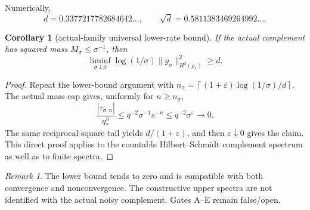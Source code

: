 \documentclass[11pt]{article}
\newtheorem{corollary}[theorem]{Corollary}
\theoremstyle{remark}\newtheorem{remark}[theorem]{Remark}
\begin{document}
Numerically,
\[
 d=0.3377217782684642\ldots,
 \qquad \sqrt d=0.5811383469264992\ldots.
\]

\begin{corollary}[actual-family universal lower-rate bound]
If the actual complement has squared mass $M_\sigma\le\sigma^{-1}$, then
\[
 \liminf_{\sigma\downarrow0}
 \log(1/\sigma)\|g_\sigma\|_{H^2(\rho_*)}^2\ge d.
\]
\end{corollary}
\begin{proof}
Repeat the lower-bound argument with
$n_\sigma=\left\lceil
 (1+\varepsilon)\log(1/\sigma)/d\right\rceil$.  The actual mass
cap gives, uniformly for $n\ge n_\sigma$,
\[
 \frac{|\tau_{\sigma,n}|}{q_*^n}
 \le q^{-2}\sigma^{-1}s^{-n}\le q^{-2}\sigma^\varepsilon\to0.
\]
The same reciprocal-square tail yields $d/(1+\varepsilon)$, and then
$\varepsilon\downarrow0$ gives the claim.  This direct proof applies to the
countable Hilbert--Schmidt complement spectrum as well as to finite spectra.
\end{proof}

\begin{remark}
The lower bound tends to zero and is compatible with both convergence and
nonconvergence.  The constructive upper spectra are not identified with the
actual noisy complement.  Gates A--E remain false/open.
\end{remark}
\end{document}
